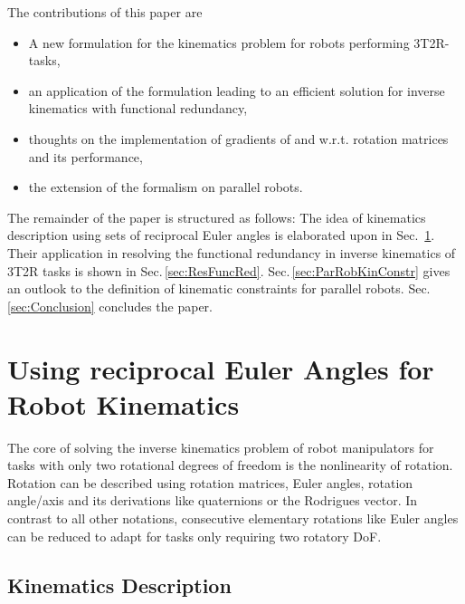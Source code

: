 \documentclass[twocolumn,10pt]{IFTOMM}
\begin{document}
The contributions of this paper are
\begin{itemize}
    \item A new formulation for the kinematics problem for robots performing 3T2R-tasks,
    \item an application of the formulation leading to an efficient solution for inverse kinematics with functional redundancy,
    \item thoughts on the implementation of gradients of and w.r.t. rotation matrices and its performance,
    \item the extension of the formalism on parallel robots.
\end{itemize}

The remainder of the paper is structured as follows: The idea of kinematics description using sets of reciprocal Euler angles is elaborated upon in Sec.\, \ref{sec:RecEulAng}.
Their application in resolving the functional redundancy in inverse kinematics of 3T2R tasks is shown in Sec.\,\ref{sec:ResFuncRed}.
Sec.\,\ref{sec:ParRobKinConstr} gives an outlook to the definition of kinematic constraints for parallel robots. 
Sec.\,\ref{sec:Conclusion} concludes the paper.

\section{Using reciprocal Euler Angles for Robot Kinematics}
\label{sec:RecEulAng}

The core of solving the inverse kinematics problem of robot manipulators for tasks with only two rotational degrees of freedom is the nonlinearity of rotation.
Rotation can be described using rotation matrices, Euler angles, rotation angle/axis and its derivations like quaternions or the Rodrigues vector.
In contrast to all other notations, consecutive elementary rotations like Euler angles can be reduced to adapt for tasks only requiring two rotatory DoF.

\subsection{Kinematics Description}
\label{sec:RecEulAng_KinDesc}
\end{document}

